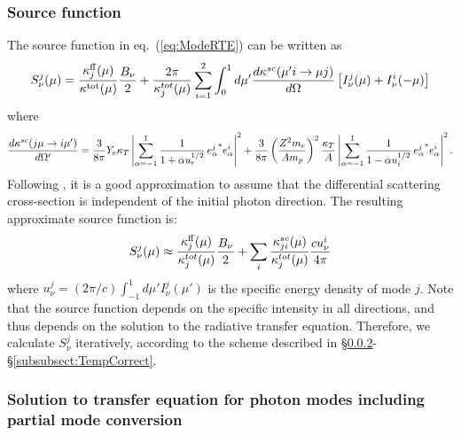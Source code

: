 \documentclass[useAMS,onecolumn,usenatbib,usegraphicx]{mn2e}
\begin{document}
\subsubsection{Source function}
\label{subsubsect:SourceFunc}

The source function in eq.~(\ref{eq:ModeRTE}) can be written as
\begin{eqnarray}
S_{\nu}^j(\mu) = {\kappa^{\rm ff}_j(\mu)\over\kappa^{\rm tot}(\mu)}{B_{\nu}\over 2}+
	{2\pi\over\kappa_j^{tot}(\mu)}\sum_{i=1}^2\int_0^1 d\mu' 
	{d\kappa^{sc}(\mu' i\rightarrow \mu j)\over d\Omega}\left[I_{\nu}^j(\mu)+I_{\nu}^i(-\mu)\right]
\end{eqnarray}
where \citep[][]{Ventura79a}
\begin{eqnarray}
{d\kappa^{sc}(j \mu\rightarrow i \mu')\over d\Omega'} = {3\over 8\pi}Y_e \kappa_T\left|\sum_{\alpha=-1}^1 
{1\over 1+\alpha u_e^{1/2}}\, {e^j_{\alpha}}^* e^i_{\alpha}\right|^2 + 
{3\over 8\pi}\left({Z^2 m_e\over A m_p}\right)^2 {\kappa_T\over A} 
\left|\sum_{\alpha=-1}^1 {1\over 1-\alpha u_i^{1/2}}\, {e_{\alpha}^j}^* e_{\alpha}^i\right|^2.
\end{eqnarray}
Following \citet[][]{HoLai01a}, 
it is a good approximation to assume that the differential scattering cross-section is independent of the initial 
photon direction.
The resulting approximate source function is:
\begin{eqnarray}
S^j_{\nu}(\mu)\approx {\kappa_j^{\rm ff}(\mu)\over\kappa_j^{tot}(\mu)}{B_{\nu}\over 2}+\sum_i{\kappa_{ji}^{sc}(\mu)\over 
\kappa_j^{tot}(\mu)}{c u_{\nu}^i\over 4\pi}
\end{eqnarray}
where $u_{\nu}^j=(2\pi/c)\int_{-1}^1 d\mu' I^j_{\nu}(\mu')$ is the specific energy density of mode $j$.
Note that 
the source function depends on the specific intensity in all directions, and thus depends on 
the solution to the radiative transfer equation.  Therefore, we calculate $S_{\nu}^j$ iteratively, 
according to the scheme described in \S\ref{subsubsect:ModeSol}-\S\ref{subsubsect:TempCorrect}.

\subsubsection{Solution to transfer equation for photon modes including partial mode conversion}
\label{subsubsect:ModeSol}
\end{document}
